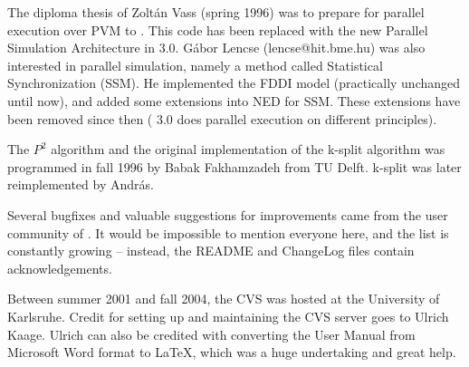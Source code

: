 The diploma thesis of Zolt\'{a}n Vass (spring 1996) was to prepare
{\opp} for parallel execution over PVM to {\opp}. This code has been
replaced with the new Parallel Simulation Architecture in {\opp} 3.0.
G\'{a}bor Lencse (lencse@hit.bme.hu) was also interested in parallel
simulation, namely a method called Statistical Synchronization (SSM).
He implemented the FDDI model (practically unchanged until now), and added
some extensions into NED for SSM. These extensions have been removed
since then ({\opp} 3.0 does parallel execution on different principles).

The $P^{2}$ algorithm and the original implementation of the k-split algorithm
was programmed in fall 1996 by Babak Fakhamzadeh from TU Delft.
k-split was later reimplemented by Andr\'{a}s.

Several bugfixes and valuable suggestions for improvements came
from the user community of {\opp}. It would be impossible to
mention everyone here, and the list is constantly growing --
instead, the README and ChangeLog files contain acknowledgements.

Between summer 2001 and fall 2004, the {\opp} CVS was hosted
at the University of Karlsruhe. Credit for setting
up and maintaining the CVS server goes to Ulrich Kaage.
Ulrich can also be credited with converting the User Manual from
Microsoft Word format to LaTeX, which was a huge undertaking
and great help.



